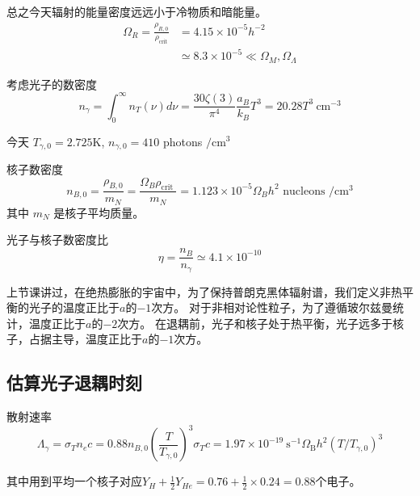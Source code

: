 \documentclass[12pt]{ctexart}
\begin{document}
总之今天辐射的能量密度远远小于冷物质和暗能量。
\begin{equation}
    \begin{aligned}
        \Omega_{R}=\frac{\rho_{R, 0}}{\rho_\text{crit}} &=4.15 \times 10^{-5} h^{-2} \\
        & \simeq 8.3 \times 10^{-5} \ll \Omega_M, \Omega_\Lambda
    \end{aligned}
\end{equation}

考虑光子的数密度
\begin{equation}
    n_{\gamma}=\int_{0}^{\infty} n_{T}(\nu) d \nu=\frac{30 \zeta(3)}{\pi^{4}} \frac{a_{B}}{k_{B}} T^{3}=20.28 T^{3} \mathrm{~cm}^{-3}
\end{equation}

今天 $T_{\gamma,0} = 2.725 \mathrm{K}$, $n_{\gamma, 0}=410$ photons $/ \mathrm{cm}^{3}$

核子数密度
\begin{equation}
    n_{B, 0}=\frac{\rho_{B, 0}}{m_{N}}=\frac{\Omega_{B} \rho_{\text {crit }}}{m_{N}}=1.123 \times 10^{-5} \Omega_{B} h^{2} \text { nucleons } / \mathrm{cm}^{3}
\end{equation}
其中 $m_{N}$ 是核子平均质量。

光子与核子数密度比
\begin{equation}
    \eta = \frac{n_{B}}{n_{\gamma}} \simeq 4.1\times 10^{-10}
\end{equation}

上节课讲过，在绝热膨胀的宇宙中，为了保持普朗克黑体辐射谱，我们定义非热平衡的光子的温度正比于$a$的$-1$次方。
对于非相对论性粒子，为了遵循玻尔兹曼统计，温度正比于$a$的$-2$次方。
在退耦前，光子和核子处于热平衡，光子远多于核子，占据主导，温度正比于$a$的$-1$次方。

\subsection*{估算光子退耦时刻}

散射速率
\begin{equation}
    \Lambda_\gamma=\sigma_{T} n_{e} c=0.88 n_{B,0}\left(\frac{T}{T_{\gamma,0}}\right)^{3} \sigma_{T} c=1.97 \times 10^{-19} \mathrm{~s}^{-1} \Omega_{\mathrm{B}}{h }^{2}\left(T / T_{\gamma,0}\right)^{3}
\end{equation}

其中用到平均一个核子对应$Y_H+\frac{1}{2}Y_{He}=0.76+\frac{1}{2}\times 0.24=0.88$个电子。
\end{document}
